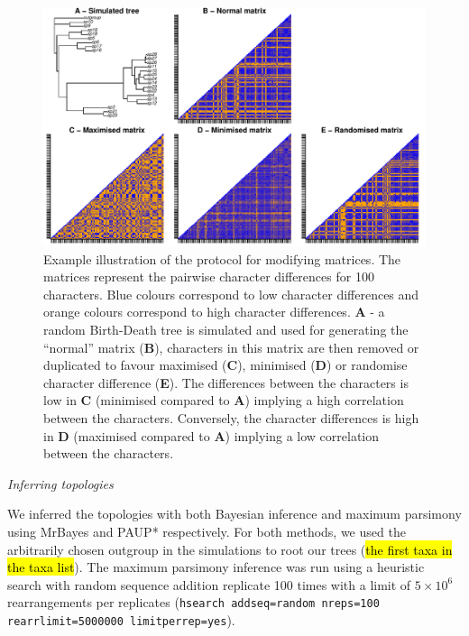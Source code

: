 \documentclass[12pt,letterpaper]{article}
\renewcommand{\subsection}[1]{%
\bigskip
\begin{center}
\begin{large}
\normalfont\itshape #1
\end{large}
\end{center}}
\begin{document}
\begin{figure}[!htbp]
\centering
   \includegraphics[width=1\textwidth]{Figures/Modif_matrix.pdf}
\caption{Example illustration of the protocol for modifying matrices. The matrices represent the pairwise character differences for 100 characters. Blue colours correspond to low character differences and orange colours correspond to high character differences. \textbf{A} - a random Birth-Death tree is simulated and used for generating the ``normal'' matrix (\textbf{B}), characters in this matrix are then removed or duplicated to favour maximised (\textbf{C}), minimised (\textbf{D}) or randomise character difference (\textbf{E}). The differences between the characters is low in \textbf{C} (minimised compared to \textbf{A}) implying a high correlation between the characters. Conversely, the character differences is high in \textbf{D} (maximised compared to \textbf{A}) implying a low correlation between the characters.}
\label{Fig:modif_matrix}
\end{figure}

\subsection{Inferring topologies}
We inferred the topologies with both Bayesian inference and maximum parsimony using MrBayes \citep[v3.2.6;][]{Ronquist2012mrbayes} and PAUP* \citep[v4.0a151;][]{swofford2001paup} respectively.
For both methods, we used the arbitrarily chosen outgroup in the simulations to root our trees (\hl{the first taxa in the taxa list}).
The maximum parsimony inference was run using a heuristic search with random sequence addition replicate 100 times with a limit of $5\times10^6$ rearrangements per replicates (\texttt{hsearch addseq=random nreps=100 rearrlimit=5000000 limitperrep=yes}).
\end{document}
